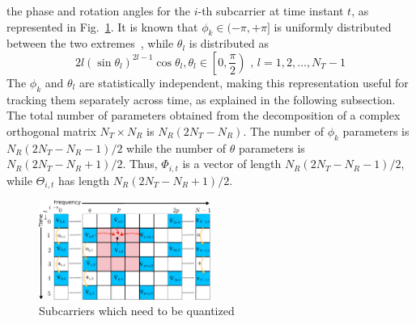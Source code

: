 \documentclass[journal,10pt,twocolumn]{IEEEtran}
\begin{document}
the phase and rotation angles for the $i$-th subcarrier at time
instant $t$, as represented in Fig.~\ref{fig:adpm-fig}. It is known
that $\phi_k \in (-\pi, + \pi]$ is uniformly distributed between the
two extremes~\cite{4114278}, while $\theta_l$ is distributed as
\begin{equation}
2l(\sin\theta_l)^{2l-1}\cos\theta_l, \theta_l \in \left[0, \frac{\pi}{2}\right) \mbox{ , } l = 1,2,\ldots,N_T -1
\end{equation}
The $\phi_k$ and $\theta_l$ are statistically independent, making this
representation useful for tracking them separately across time, as
explained in the following subsection. The total number of parameters
obtained from the decomposition of a complex orthogonal matrix
$N_{T} \times N_{R} $ is $N_{R}(2N_{T} - N_{R})$. The
number of $\phi_k$ parameters is $N_{R}(2N_{T} - N_{R}-1)/2$ while the
number of $\theta$ parameters is $N_{R}(2N_{T} - N_{R}+1)/2$. Thus, $\Phi_{i,t}$ is a vector of length $N_{R}(2N_{T} - N_{R}-1)/2$, while $\Theta_{i,t}$ has length $N_{R}(2N_{T} - N_{R}+1)/2$.
\begin{figure}
\includegraphics[width=0.5\textwidth]{images/new-adpm.pdf}
\caption{\label{fig:adpm-fig}Subcarriers which need to be quantized}
\end{figure}
\end{document}
